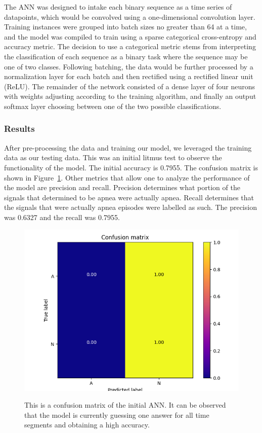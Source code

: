 \documentclass[12pt,titlepage]{article}
\begin{document}
The ANN was designed to intake each binary sequence as a time series of datapoints, which would be convolved using a one-dimensional convolution layer. Training
instances were grouped into batch sizes no greater than 64 at a time, and the model was compiled to train using a sparse categorical cross-entropy and accuracy 
metric. The decision to use a categorical metric stems from interpreting the classification of each sequence as a binary task where the sequence may be one of two 
classes. Following batching, the data would be further processed by a normalization layer for each batch and then rectified using a rectified linear unit (ReLU). 
The remainder of the network consisted of a dense layer of four neurons with weights adjusting according to the training algorithm, and finally an output softmax
layer choosing between one of the two possible classifications. 

\subsubsection{Results}
After pre-processing the data and training our model, we leveraged the training data as our testing data. This was an initial litmus test to observe the functionality of the model. The initial accuracy is 0.7955. The confusion matrix is shown in Figure~\ref{fig:cmANN}. Other metrics that allow one to analyze the performance of the model are precision and recall. Precision determines what portion of the signals that determined to be apnea were actually apnea. Recall determines that the signals that were actually apnea episodes were labelled as such. The precision was 0.6327 and the recall was 0.7955.
\begin{figure}[H]
  \centering
  \includegraphics[width=5in]{NN.png}
  \label{fig:cmANN}
  \caption{This is a confusion matrix of the initial ANN. It can be observed that the model is currently guessing one answer for all time segments and obtaining a high accuracy.}
\end{figure}
\end{document}
